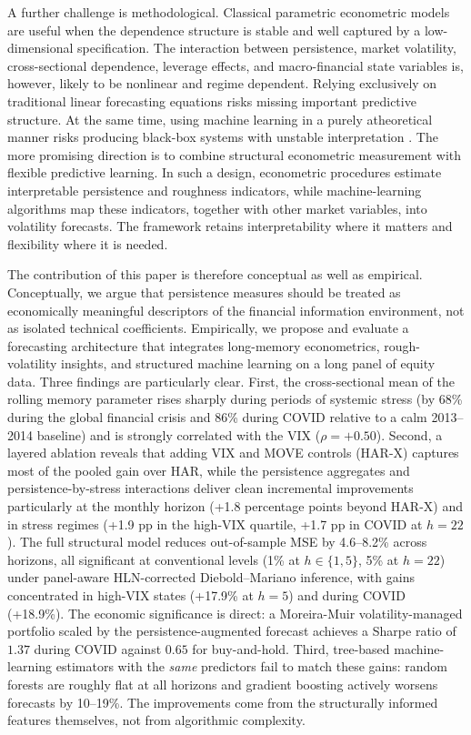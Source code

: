 \documentclass[11pt,a4paper]{article}
\begin{document}
A further challenge is methodological. Classical parametric econometric
models are useful when the dependence structure is stable and well captured
by a low-dimensional specification. The interaction between persistence,
market volatility, cross-sectional dependence, leverage effects, and
macro-financial state variables is, however, likely to be nonlinear and
regime dependent. Relying exclusively on traditional linear forecasting
equations risks missing important predictive structure. At the same time,
using machine learning in a purely atheoretical manner risks producing
black-box systems with unstable interpretation \citep{gu2020empirical}. The
more promising direction is to combine structural econometric measurement
with flexible predictive learning. In such a design, econometric procedures
estimate interpretable persistence and roughness indicators, while
machine-learning algorithms map these indicators, together with other
market variables, into volatility forecasts. The framework retains
interpretability where it matters and flexibility where it is needed.

The contribution of this paper is therefore conceptual as well as
empirical. Conceptually, we argue that persistence measures should be
treated as economically meaningful descriptors of the financial information
environment, not as isolated technical coefficients. Empirically, we
propose and evaluate a forecasting architecture that integrates
long-memory econometrics, rough-volatility insights, and structured
machine learning on a long panel of equity data. Three findings are
particularly clear. First, the cross-sectional mean of the rolling memory
parameter rises sharply during periods of systemic stress (by 68\% during
the global financial crisis and 86\% during COVID relative to a calm
2013--2014 baseline) and is strongly correlated with the VIX
($\rho = +0.50$). Second, a layered ablation reveals that adding VIX
and MOVE controls (HAR-X) captures most of the pooled gain over HAR,
while the persistence aggregates and persistence-by-stress interactions
deliver clean incremental improvements particularly at the monthly
horizon (+1.8 percentage points beyond HAR-X) and in stress regimes
(+1.9 pp in the high-VIX quartile, +1.7 pp in COVID at $h=22$). The
full structural model reduces out-of-sample MSE by 4.6--8.2\% across
horizons, all significant at conventional levels (1\% at $h\in\{1,5\}$, 5\% at $h=22$) under panel-aware
HLN-corrected Diebold--Mariano inference, with gains concentrated in
high-VIX states (+17.9\% at $h=5$) and during COVID (+18.9\%). The
economic significance is direct: a Moreira-Muir volatility-managed
portfolio scaled by the persistence-augmented forecast achieves a
Sharpe ratio of $1.37$ during COVID against $0.65$ for buy-and-hold.
Third, tree-based machine-learning estimators with the \emph{same}
predictors fail to match these gains: random forests are roughly flat
at all horizons and gradient boosting actively worsens forecasts by
10--19\%. The improvements come from the structurally informed
features themselves, not from algorithmic complexity.
\end{document}
